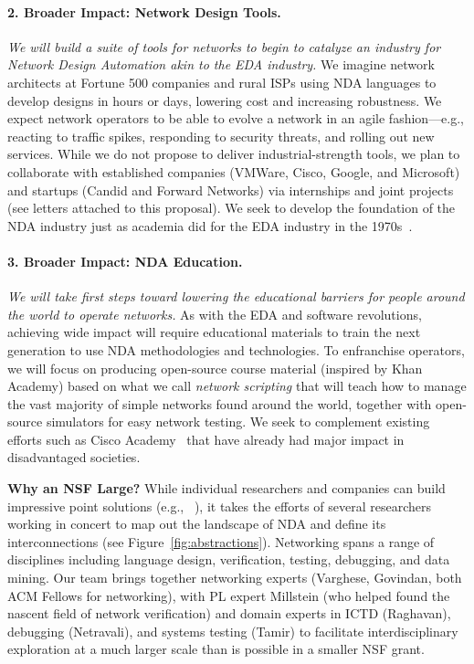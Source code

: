 \paragraph*{2. Broader Impact: Network Design Tools.}{\em We will build a suite of tools for networks to begin to catalyze an industry for Network Design Automation akin to the EDA industry.}   
%
 We imagine network architects at Fortune 500 companies and rural ISPs using NDA languages to develop designs in hours or days, lowering cost and increasing robustness. We expect network operators to be able to evolve a network in an agile fashion---e.g., reacting to traffic spikes, responding to security threats, and rolling out new services. While we do not propose to deliver industrial-strength tools, we plan to collaborate with established companies (VMWare, Cisco, Google, and Microsoft) and startups (Candid and Forward Networks) via internships and joint projects (see letters  attached to this proposal). We seek to develop the foundation of the NDA industry just as academia did for the EDA industry in the 1970s~\cite{alberto}.

\paragraph*{3. Broader Impact: NDA Education.} {\em We will take first steps toward lowering the educational barriers for people around the world to operate networks.}
%
As with the EDA and software revolutions, achieving wide impact will require educational materials to train the next generation to use NDA methodologies and technologies. To enfranchise operators, we will focus on producing open-source course material (inspired by Khan Academy) based on what we call {\em network scripting} that will teach how to manage the vast majority of simple networks found around the world, together with open-source simulators for easy network testing. We seek to complement existing efforts such as Cisco Academy~\cite{ciscoacademy} that have already had major impact in disadvantaged societies. 

{\bf Why an NSF Large?}  While individual researchers and companies can build impressive point solutions (e.g., ~\cite{b4}), it takes the efforts of several researchers working in concert to map out the landscape of NDA and define its interconnections (see Figure~\ref{fig:abstractions}). Networking spans a range of disciplines including language design, verification, testing, debugging, and data mining. Our team brings together networking experts (Varghese, Govindan, both ACM Fellows for networking), with PL expert Millstein (who helped found the nascent field of network verification) and domain experts in ICTD (Raghavan), debugging (Netravali), and systems testing (Tamir) to facilitate interdisciplinary exploration at a much larger scale than is possible in a smaller NSF grant.  

